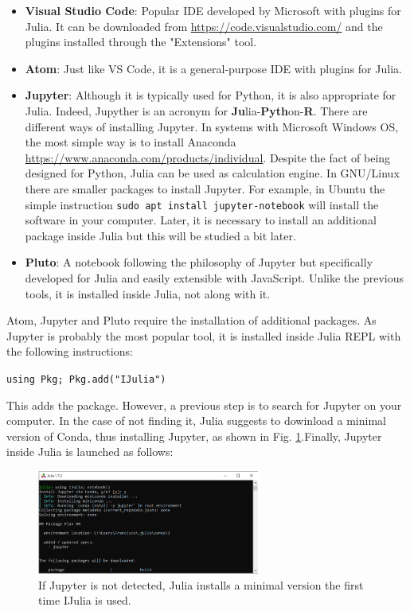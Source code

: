 \begin{itemize}
	\item \textbf{Visual Studio Code}: Popular IDE developed by Microsoft with plugins for Julia. It can be downloaded from \href{https://code.visualstudio.com/}{https://code.visualstudio.com/} and the plugins installed through the "Extensions" tool.
	\item \textbf{Atom}: Just like VS Code, it is a general-purpose IDE with plugins for Julia.
	\item \textbf{Jupyter}: Although it is typically used for Python, it is also appropriate for Julia. Indeed, Jupyther is an acronym for \textbf{Ju}lia-\textbf{Pyth}on-\textbf{R}. There are different ways of installing Jupyter. In systems with Microsoft Windows OS, the most simple way is to install Anaconda \href{https://www.anaconda.com/products/individual}{https://www.anaconda.com/products/individual}. Despite the fact of being designed for Python, Julia can be used as calculation engine. In GNU/Linux there are smaller packages to install Jupyter. For example, in Ubuntu the simple instruction \texttt{sudo apt install jupyter-notebook} will install the software in your computer. Later, it is necessary to install an additional package inside Julia but this will be studied a bit later.
	\item \textbf{Pluto}: A notebook following the philosophy of Jupyter but specifically developed for Julia and easily extensible with JavaScript. Unlike the previous tools, it is installed inside Julia, not along with it. 
\end{itemize}
%
Atom, Jupyter and Pluto require the installation of additional packages. As Jupyter is probably the most popular tool, it is installed inside Julia REPL with the following instructions:

\vspace{1mm}
\begin{center}
	\texttt{using Pkg; Pkg.add("IJulia")}
\end{center}
\vspace{1mm}

This adds the package. However, a previous step is to search for Jupyter on your computer. In the case of not finding it, Julia suggests to dowinload a minimal version of Conda, thus installing Jupyter, as shown in Fig. \ref{Fig:Installling_Conda_with_julia}.Finally, Jupyter inside Julia is launched as follows:
%
\begin{figure}
	\centering
	\includegraphics[width=0.65\textwidth]{fig/Julia_using_miniconda}
	\caption{If Jupyter is not detected, Julia installs a minimal version the first time IJulia is used.}
	\label{Fig:Installling_Conda_with_julia}
\end{figure}

